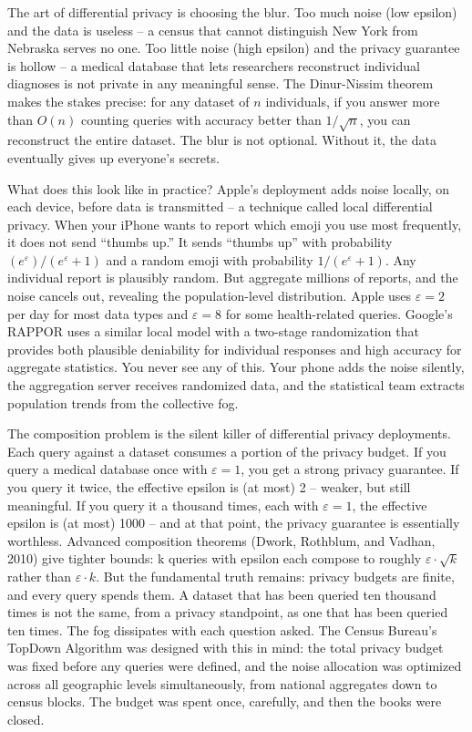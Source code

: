 \documentclass[
  11pt,
  openany]{report}
\begin{document}
The art of differential privacy is choosing the blur. Too much noise (low
epsilon) and the data is useless -- a census that cannot distinguish New York
from Nebraska serves no one. Too little noise (high epsilon) and the privacy
guarantee is hollow -- a medical database that lets researchers reconstruct
individual diagnoses is not private in any meaningful sense. The Dinur-Nissim
theorem makes the stakes precise: for any dataset of \(n\) individuals, if you
answer more than \(O(n)\) counting queries with accuracy better than
\(1/\sqrt{n}\), you can reconstruct the entire dataset. The blur is not
optional. Without it, the data eventually gives up everyone's secrets.

What does this look like in practice? Apple's deployment adds noise locally, on
each device, before data is transmitted -- a technique called local differential
privacy. When your iPhone wants to report which emoji you use most frequently,
it does not send ``thumbs up.'' It sends ``thumbs up'' with probability
\((e^\varepsilon)/(e^\varepsilon + 1)\) and a random emoji with probability
\(1/(e^\varepsilon + 1)\). Any individual report is plausibly random. But
aggregate millions of reports, and the noise cancels out, revealing the
population-level distribution. Apple uses \(\varepsilon = 2\) per day for most
data types and \(\varepsilon = 8\) for some health-related queries. Google's
RAPPOR uses a similar local model with a two-stage randomization that provides
both plausible deniability for individual responses and high accuracy for
aggregate statistics. You never see any of this. Your phone adds the noise
silently, the aggregation server receives randomized data, and the statistical
team extracts population trends from the collective fog.

The composition problem is the silent killer of differential privacy
deployments. Each query against a dataset consumes a portion of the privacy
budget. If you query a medical database once with \(\varepsilon = 1\), you get a
strong privacy guarantee. If you query it twice, the effective epsilon is (at
most) 2 -- weaker, but still meaningful. If you query it a thousand times, each
with \(\varepsilon = 1\), the effective epsilon is (at most) 1000 -- and at that
point, the privacy guarantee is essentially worthless. Advanced composition
theorems (Dwork, Rothblum, and Vadhan, 2010) give tighter bounds: k queries with
epsilon each compose to roughly \(\varepsilon \cdot \sqrt{k}\) rather than
\(\varepsilon \cdot k\). But the fundamental truth remains: privacy budgets are
finite, and every query spends them. A dataset that has been queried ten
thousand times is not the same, from a privacy standpoint, as one that has been
queried ten times. The fog dissipates with each question asked. The Census
Bureau's TopDown Algorithm was designed with this in mind: the total privacy
budget was fixed before any queries were defined, and the noise allocation was
optimized across all geographic levels simultaneously, from national aggregates
down to census blocks. The budget was spent once, carefully, and then the books
were closed.
\end{document}
